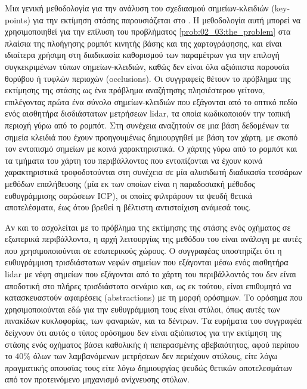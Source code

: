 Μια γενική μεθοδολογία για την ανάλυση του σχεδιασμού σημείων-κλειδιών
(key-points) για την εκτίμηση στάσης παρουσιάζεται στο \cite{Bosse2009}. Η
μεθοδολογία αυτή μπορεί να χρησιμοποιηθεί για την επίλυση του προβλήματος
\ref{prob:02_03:the_problem} στα πλαίσια της πλοήγησης ρομπότ κινητής βάσης και
της χαρτογράφησης, και είναι ιδιαίτερα χρήσιμη στη διαδικασία καθορισμού των
παραμέτρων για την επιλογή συγκεκριμένων τύπων σημείων-κλειδιών, καθώς δεν
είναι όλα αξιόπιστα παρουσία θορύβου ή τυφλών περιοχών (occlusions). Οι
συγγραφείς θέτουν το πρόβλημα της εκτίμησης της στάσης ως ένα πρόβλημα
αναζήτησης πλησιέστερου γείτονα, επιλέγοντας πρώτα ένα σύνολο σημείων-κλειδιών
που εξάγονται από το οπτικό πεδίο ενός αισθητήρα δισδιάστατων μετρήσεων lidar,
τα οποία κωδικοποιούν την τοπική περιοχή γύρω από το ρομπότ. Στη συνέχεια
αναζητούν σε μια βάση δεδομένων τα σημεία κλειδιά που έχουν προηγουμένως
δημιουργηθεί με βάση τον χάρτη, με σκοπό τον εντοπισμό σημείων με κοινά
χαρακτηριστικά. Ο χάρτης γύρω από το ρομπότ και τα τμήματα του χάρτη του
περιβάλλοντος που εντοπίζονται να έχουν κοινά χαρακτηριστικά τροφοδοτούνται στη
συνέχεια σε μία αλυσιδωτή διαδικασία τεσσάρων μεθόδων επαλήθευσης (μία εκ των
οποίων είναι η παραδοσιακή μέθοδος ευθυγράμμισης σαρώσεων ICP), οι οποίες
φιλτράρουν τα ψευδή θετικά αποτελέσματα, έως ότου βρεθεί η βέλτιστη
αντιστοίχιση ανάμεσά τους.

Αν και το \cite{Brenner2010} ασχολείται με το πρόβλημα της εκτίμησης της στάσης
ενός οχήματος σε εξωτερικά περιβάλλοντα, η αρχή λειτουργίας της μεθόδου του
είναι ανάλογη με αυτές που χρησιμοποιούνται σε εσωτερικούς χώρους.  Ο
συγγραφέας υποστηρίζει ότι η ευθυγράμμιση τρισδιάστατων νεφών σημείων που
εξάγονται μέσω ενός αισθητήρα lidar με νέφη σημείων που εξάγονται από το χάρτη
του περιβάλλοντός του δεν είναι αποδοτική στο πλήρες τρισδιάστατο σενάριο και,
ως εκ τούτου, είναι επιθυμητό να κατασκευαστούν αφαιρέσεις (abstractions) με τη
μορφή ορόσημων. Το ορόσημα που χρησιμοποιούνται εδώ για την ευθυγράμμιση τους
είναι στύλοι, όπως αυτές των πινακίδων κυκλοφορίας, των φαναριών, και τα
δέντρων. Τα ευρήματα του συγγραφέα δείχνουν ότι αυτός ο τύπος ορόσημου δεν
είναι αξιόπιστος για την εκτίμηση της στάσης ενός οχήματος βάσει καθολικής ή
πεπερασμένης αβεβαιότητος, αφού περίπου το $40\%$ όλων των λαμβανόμενων
μετρήσεων δεν περιέχουν στύλους, είτε λόγω πραγματικής απουσίας τους είτε
λόγω δημιουργίας ψευδώς θετικών αποτελεσμάτων από τον προτεινόμενο μηχανισμό
ανίχνευσης στύλων.

